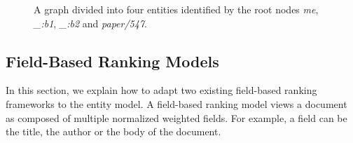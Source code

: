 %

\begin{figure}
\centering
{}
\caption{A graph divided into four entities identified by the root nodes \emph{me}, \emph{\_:b1}, \emph{\_:b2} and \emph{paper/547}.}
\label{fig:rdf-graph}
\end{figure}

\subsection{Field-Based Ranking Models}
\label{sec:ranking-wod}

In this section, we explain how to adapt two existing field-based ranking frameworks to the entity model.
A field-based ranking model views a document as composed of multiple normalized weighted fields. For example, a field can be the title, the author or the body of the document.

